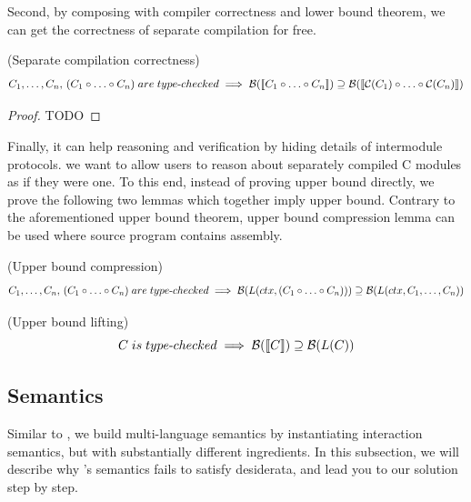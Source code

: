 {Second, by composing with compiler correctness and lower bound theorem, we can get the correctness of separate compilation for free.
\begin{corollary} (Separate compilation correctness)
  \[                            %
  C_{1}, \ldots, C_{n}, \, (C_{1} \circ \ldots \circ C_{n}) \; are \; type\mymathhyphen{}checked \implies
  \mathcal{B}(\llbracket C_{1} \circ \ldots \circ C_{n} \rrbracket) \supseteq \mathcal{B}(\llbracket \mathcal{C}(C_{1}) \circ \ldots \circ \mathcal{C}(C_{n}) \rrbracket)
  \]
\end{corollary}
\begin{proof}
  TODO
\end{proof}
Finally, it can help reasoning and verification by hiding details of intermodule protocols.
\ie{} we want to allow users to reason about separately compiled C modules as if they were one.
To this end, instead of proving upper bound directly, we prove the following two lemmas which together imply upper bound.
Contrary to the aforementioned upper bound theorem, upper bound compression lemma can be used where source program contains assembly.


\begin{lemma} (Upper bound compression)
  \[
  C_{1}, \ldots, C_{n}, \, (C_{1} \circ \ldots \circ C_{n}) \; are \; type{\hbox{-}}{}checked \implies
  \mathcal{B}(L(ctx, (C_{1} \circ \ldots \circ C_{n}))) \supseteq \mathcal{B}(L(ctx, C_{1}, \ldots, C_{n}))
  \]
\end{lemma}

\begin{lemma} (Upper bound lifting)
  \[
  C \; is \; type{\hbox{-}}{}checked \implies
  \mathcal{B}(\llbracket C \rrbracket) \supseteq \mathcal{B}(L(C))
  \]
\end{lemma}





\subsection{Semantics}\label{sec:overview:semantics}
Similar to \ccc{}, we build multi-language semantics by instantiating interaction semantics, but with substantially different ingredients.
In this subsection, we will describe why \ccc{}'s semantics fails to satisfy desiderata, and lead you to our solution step by step.

}
